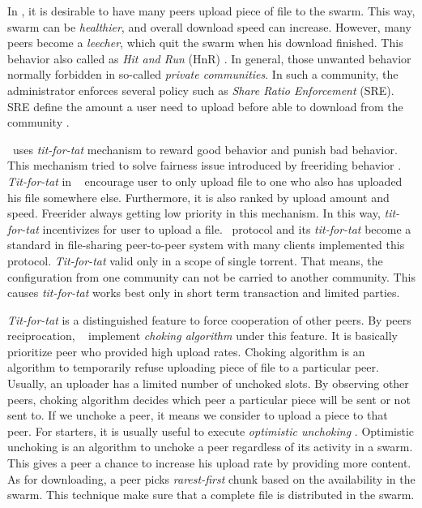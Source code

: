In \bt, it is desirable to have many peers upload piece of file to the swarm. This way, swarm can be \textit{healthier}, and overall download speed can increase. However, many peers become a \textit{leecher}, which quit the swarm when his download finished. This behavior also called as \textit{Hit and Run} (HnR) \cite{2014:sustainabilitytorrent:chen}. In general, those unwanted behavior normally forbidden in so-called \textit{private communities}. In such a community, the administrator enforces several policy such as \textit{Share Ratio Enforcement} (SRE). SRE define the amount a user need to upload before able to download from the community \cite{2012:economicbt:kash}. 

\bt~uses \textit{tit-for-tat} mechanism to reward good behavior and punish bad behavior. This mechanism tried to solve fairness issue introduced by freeriding behavior \cite{2003:bittorrent:cohen}. \textit{Tit-for-tat} in \bt~ encourage user to only upload file to one who also has uploaded his file somewhere else. Furthermore, it is also ranked by upload amount and speed. Freerider always getting low priority in this mechanism. In this way, \textit{tit-for-tat} incentivizes for user to upload a file. \bt~protocol and its \textit{tit-for-tat} become a standard in file-sharing peer-to-peer system with many clients implemented this protocol. \textit{Tit-for-tat} valid only in a scope of single torrent. That means, the configuration from one community can not be carried to another community. This causes \textit{tit-for-tat} works best only in short term transaction and limited parties.

\textit{Tit-for-tat} is a distinguished feature to force cooperation of other peers. By peers reciprocation, \bt~ implement \textit{choking algorithm} under this feature. It is basically prioritize peer who provided high upload rates. Choking algorithm is an algorithm to temporarily refuse uploading piece of file to a particular peer. Usually, an uploader has a limited number of unchoked slots. By observing other peers, choking algorithm decides which peer a particular piece will be sent or not sent to. If we unchoke a peer, it means we consider to upload a piece to that peer. For starters, it is usually useful to execute \textit{optimistic unchoking} \cite{2003:bittorrent:cohen}. Optimistic unchoking is an algorithm to unchoke a peer regardless of its activity in a swarm. This gives a peer a chance to increase his upload rate by providing more content. As for downloading, a peer picks \textit{rarest-first} chunk based on the availability in the swarm. This technique make sure that a complete file is distributed in the swarm.

